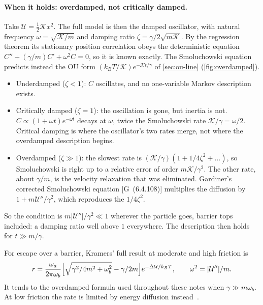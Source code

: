 \documentclass[11pt]{article}
\numberwithin{equation}{section}
\newcommand{\G}[1]{[G~(#1)]}
\begin{document}
\paragraph{When it holds: overdamped, not critically damped.} Take $\mathcal U=\tfrac12\mathcal Kx^2$. The full model is then
the damped oscillator, with natural frequency $\omega=\sqrt{\mathcal K/m}$ and damping ratio
$\zeta=\gamma/2\sqrt{m\mathcal K}$. By the regression theorem its stationary position correlation obeys the
deterministic equation $C''+(\gamma/m)C'+\omega^2C=0$, so it is known exactly. The Smoluchowski equation predicts
instead the OU form $(k_BT/\mathcal K)e^{-\mathcal Kt/\gamma}$ of \cref{sec:ou-line} (\cref{fig:overdamped}).
\begin{itemize}
  \item Underdamped ($\zeta<1$): $C$ oscillates, and no one-variable Markov description exists.
  \item Critically damped ($\zeta=1$): the oscillation is gone, but inertia is not. $C\propto(1+\omega t)e^{-\omega t}$
        decays at $\omega$, twice the Smoluchowski rate $\mathcal K/\gamma=\omega/2$. Critical damping is where the
        oscillator's two rates merge, not where the overdamped description begins.
  \item Overdamped ($\zeta\gg1$): the slowest rate is $(\mathcal K/\gamma)(1+1/4\zeta^2+\dots)$, so Smoluchowski is
        right up to a relative error of order $m\mathcal K/\gamma^2$. The other rate, about $\gamma/m$, is the
        velocity relaxation that was eliminated. Gardiner's corrected Smoluchowski equation \G{6.4.108} multiplies
        the diffusion by $1+m\mathcal U''/\gamma^2$, which reproduces the $1/4\zeta^2$.
\end{itemize}
So the condition is $m|\mathcal U''|/\gamma^2\ll1$ wherever the particle goes, barrier tops included: a damping ratio
well above $1$ everywhere. The description then holds for $t\gg m/\gamma$.

For escape over a barrier, Kramers' full result at moderate and high friction is
\begin{equation*}
  r=\frac{\omega_a}{2\pi\omega_b}\Bigl[\sqrt{\gamma^2/4m^2+\omega_b^2}-\gamma/2m\Bigr]e^{-\Delta\mathcal U/k_BT},
  \qquad \omega^2=|\mathcal U''|/m .
\end{equation*}
It tends to the overdamped formula used throughout these notes when $\gamma\gg m\omega_b$. At low friction the rate
is limited by energy diffusion instead~\cite{hanggi}.
\end{document}
